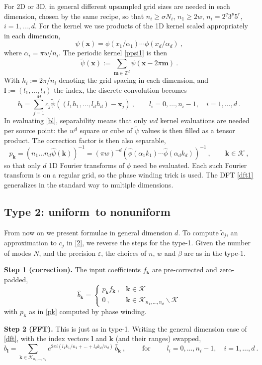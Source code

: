 \documentclass[10pt]{article}
\newcommand{\be}{\begin{equation}}
\newcommand{\ee}{\end{equation}}
\newcommand{\mbf}[1]{{\mathbf #1}}
\newcommand{\ZZ}{\mathbb{Z}}
\newcommand{\eps}{\varepsilon}
\newcommand{\xx}{\mbf{x}}
\newcommand{\kk}{\mbf{k}}
\newcommand{\KK}{{\mathcal K}}
\newcommand{\NU}{{nonuniform}}
\newcommand{\U}{{uniform}}
\newcommand{\rat}{\sigma}          %
\newcommand{\ppsi}{{\tilde\psi}}   %
\newcommand{\al}{\alpha}           %
\begin{document}
For 2D or 3D, in general different
upsampled grid sizes are needed in each dimension,
chosen by the same recipe, so that $n_i \ge \rat N_i$, $n_1 \ge 2w$,
$n_i = 2^q3^p5^r$, $i=1,\dots,d$.
For the kernel we use products of the 1D kernel scaled appropriately
in each dimension,
\be
\psi(\xx) = \phi(x_1/\al_1) \cdots \phi(x_d/\al_d)
~,
\ee
where $\al_i=\pi w/n_i$.
The periodic kernel \eqref{ppsi1} is then
\be
\ppsi(\xx) := \sum_{\mbf{m} \in \ZZ^d} \psi(\xx - 2\pi\mbf{m})
~.
\label{ppsi}
\ee
With $h_i:=2\pi/n_i$ denoting the grid spacing in each dimension,
and $\mbf{l}:=(l_1,\dots,l_d)$ the index,
the discrete convolution %
becomes
\be
b_\mbf{l} = \sum_{j=1}^M c_j \ppsi((l_1h_1,\dots,l_dh_d)-\xx_j)~,
\qquad l_i=0,\dots,n_i-1, \quad i=1,\dots,d
~.
\label{bl}
\ee
In evaluating \eqref{bl}, separability
means that only $wd$ kernel evaluations are needed per source point:
the $w^d$ square or cube of $\ppsi$ values is then filled as a tensor product.
The correction factor is then also separable,
\be
p_\kk = (n_1\dots n_d \hat\psi(\kk))^{-1} = (\pi w)^{-d}
(\hat\phi(\al_1 k_1) \cdots \hat\phi(\al_d k_d))^{-1}
~, \qquad \kk \in \KK~,
\label{pk}
\ee
so that only $d$ 1D Fourier transforms of $\phi$ need be evaluated.
Each such Fourier transform is on a regular grid, so the phase winding
trick is used.
The DFT \eqref{dft1} generalizes in the standard way to
multiple dimensions.



\subsection{Type 2: \U\ to \NU}
\label{s:2}

From now on we present formulae in general dimension $d$.
To compute $\tilde c_j$, an approximation to $c_j$ in \eqref{2},
we reverse the steps for the type-1.
Given the number of modes $N$, and the precision $\eps$,
the choices of $n$, $w$ and $\beta$ are as in the type-1.

{\bf Step 1 (correction).}
The input coefficients $f_\kk$ are pre-corrected and zero-padded,
\be
\hat b_\kk = \left\{\begin{array}{ll}p_\kk f_\kk~, & \kk \in \KK \\
0~, & \kk \in \KK_{n_1,\dots,n_d} \backslash \KK
\end{array}\right.
\ee
with $p_\kk$ as in \eqref{pk} computed by phase winding.

{\bf Step 2 (FFT).}
This is just as in type-1. Writing the general dimension
case of \eqref{dft}, with the index vectors $\mbf{l}$
and $\kk$ (and their ranges) swapped,
$$
b_\mbf{l} = \sum_{\kk\in\KK_{n_1,\dots,n_d}}
e^{2\pi i (l_1k_1/n_1 + \dots + l_dk_d/n_d)}
\,\hat b_\kk ~, \qquad \mbox{ for }
\qquad l_i=0,\dots,n_i-1, \quad i=1,\dots,d
~.
\label{dft}
$$
\end{document}

